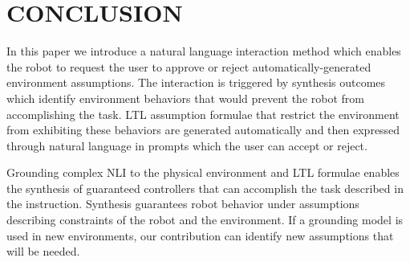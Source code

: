 \documentclass[letterpaper]{article} %
\begin{document}
\section{CONCLUSION}

In this paper we introduce a natural language interaction method which enables the robot to request the user to approve or reject automatically-generated environment assumptions. The interaction is triggered by synthesis outcomes which identify environment behaviors that would prevent the robot from accomplishing the task. LTL assumption formulae that restrict the environment from exhibiting these behaviors are generated automatically and then expressed through natural language in prompts which the user can accept or reject. 

Grounding complex NLI to the physical environment and LTL formulae enables the synthesis of guaranteed controllers that can accomplish the task described in the instruction. Synthesis guarantees robot behavior under assumptions describing constraints of the robot and the environment. If a grounding model is used in new environments, our contribution can identify new assumptions that will be needed.
\newpage


\end{document}
